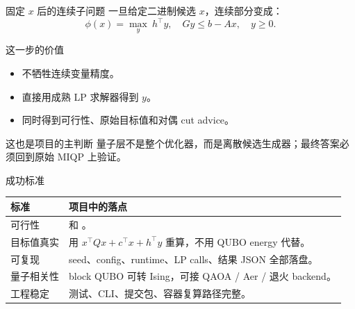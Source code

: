 \documentclass[aspectratio=169]{beamer}
\begin{document}
\begin{frame}{固定 $x$ 后的连续子问题}
\small
一旦给定二进制候选 $x$，连续部分变成：
\[
\phi(x)=\max_y\ h^\top y,\quad Gy\le b-Ax,\quad y\ge 0.
\]
\vspace{2mm}
\begin{block}{这一步的价值}
\begin{itemize}
  \item 不牺牲连续变量精度。
  \item 直接用成熟 LP 求解器得到 $y$。
  \item 同时得到可行性、原始目标值和对偶 cut advice。
\end{itemize}
\end{block}
\begin{alertblock}{这也是项目的主判断}
量子层不是整个优化器，而是离散候选生成器；最终答案必须回到原始 MIQP 上验证。
\end{alertblock}
\end{frame}

\begin{frame}{成功标准}
\small
\begin{tabularx}{\linewidth}{p{3.2cm}Y}
\toprule
标准 & 项目中的落点 \\
\midrule
可行性 &  和 。\\
目标值真实 & 用 $x^\top Qx+c^\top x+h^\top y$ 重算，不用 QUBO energy 代替。\\
可复现 & seed、config、runtime、LP calls、结果 JSON 全部落盘。\\
量子相关性 & block QUBO 可转 Ising，可接 QAOA / Aer / 退火 backend。\\
工程稳定 & 测试、CLI、提交包、容器复算路径完整。\\
\bottomrule
\end{tabularx}
\end{frame}
\end{document}
